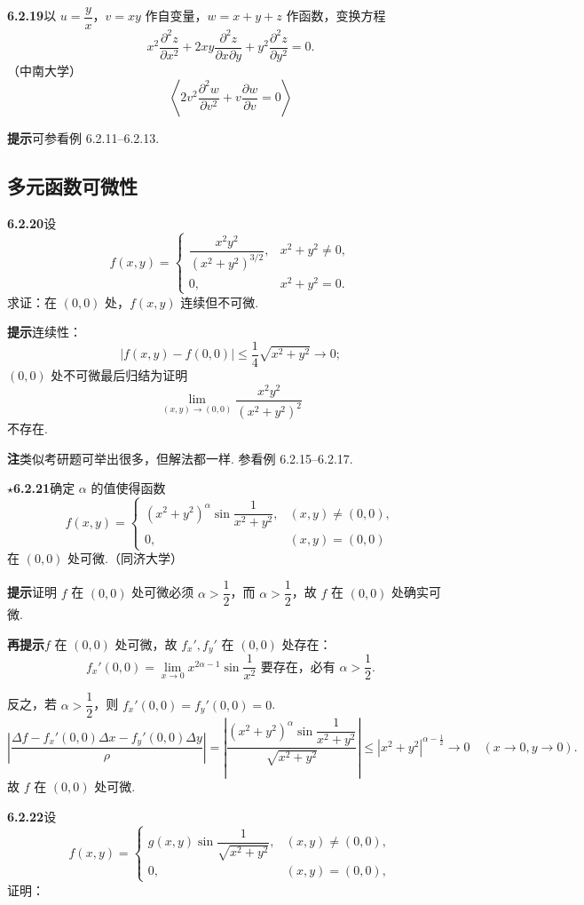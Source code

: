 \documentclass[UTF8, 12pt, fontset=fandol, oneside]{ctexart}
\begin{document}
\noindent\textbf{6.2.19}\quad 以 $u=\dfrac yx$，$v=xy$ 作自变量，$w=x+y+z$ 作函数，变换方程
\[
  x^2\frac{\partial^2z}{\partial x^2}
  +2xy\frac{\partial^2z}{\partial x\partial y}
  +y^2\frac{\partial^2z}{\partial y^2}=0.
\]
（中南大学）
\[
  \left\langle 2v^2\frac{\partial^2w}{\partial v^2}+v\frac{\partial w}{\partial v}=0\right\rangle
\]

\noindent\textbf{提示}\quad 可参看例 6.2.11--6.2.13.

\subsection*{多元函数可微性}

\noindent\textbf{6.2.20}\quad 设
\[
  f(x,y)=
  \begin{cases}
  \dfrac{x^2y^2}{(x^2+y^2)^{3/2}}, & x^2+y^2\ne0,\\
  0, & x^2+y^2=0.
  \end{cases}
\]
求证：在 $(0,0)$ 处，$f(x,y)$ 连续但不可微.

\noindent\textbf{提示}\quad 连续性：
\[
  |f(x,y)-f(0,0)|\le\frac14\sqrt{x^2+y^2}\to0;
\]
$(0,0)$ 处不可微最后归结为证明
\[
  \lim_{(x,y)\to(0,0)}\frac{x^2y^2}{(x^2+y^2)^2}
\]
不存在.

\noindent\textbf{注}\quad 类似考研题可举出很多，但解法都一样. 参看例 6.2.15--6.2.17.

\noindent\textbf{\ensuremath{\star}6.2.21}\quad 确定 $\alpha$ 的值使得函数
\[
  f(x,y)=
  \begin{cases}
  (x^2+y^2)^\alpha\sin\dfrac1{x^2+y^2}, & (x,y)\ne(0,0),\\
  0, & (x,y)=(0,0)
  \end{cases}
\]
在 $(0,0)$ 处可微.（同济大学）

\noindent\textbf{提示}\quad 证明 $f$ 在 $(0,0)$ 处可微必须 $\alpha>\dfrac12$，而 $\alpha>\dfrac12$，故 $f$ 在 $(0,0)$ 处确实可微.

\noindent\textbf{再提示}\quad $f$ 在 $(0,0)$ 处可微，故 $f_x',f_y'$ 在 $(0,0)$ 处存在：
\[
  f_x'(0,0)=\lim_{x\to0}x^{2\alpha-1}\sin\frac1{x^2}\text{ 要存在，必有 }\alpha>\frac12.
\]

\noindent 反之，若 $\alpha>\dfrac12$，则 $f_x'(0,0)=f_y'(0,0)=0$.
\[
  \left|
  \frac{\Delta f-f_x'(0,0)\Delta x-f_y'(0,0)\Delta y}{\rho}
  \right|
  =
  \left|
  \frac{(x^2+y^2)^\alpha\sin\dfrac1{x^2+y^2}}{\sqrt{x^2+y^2}}
  \right|
  \le |x^2+y^2|^{\alpha-\frac12}\to0\quad(x\to0,y\to0).
\]
故 $f$ 在 $(0,0)$ 处可微.

\noindent\textbf{6.2.22}\quad 设
\[
  f(x,y)=
  \begin{cases}
  g(x,y)\sin\dfrac1{\sqrt{x^2+y^2}}, & (x,y)\ne(0,0),\\
  0, & (x,y)=(0,0),
  \end{cases}
\]
证明：
\end{document}
